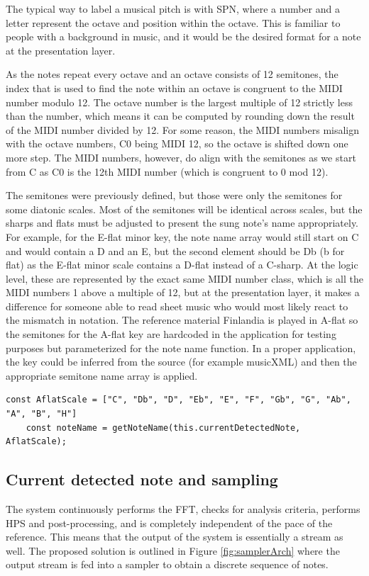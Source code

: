The typical way to label a musical pitch is with SPN, where a number and a letter represent the octave and position within the octave. This is familiar to people with a background in music, and it would be the desired format for a note at the presentation layer.

As the notes repeat every octave and an octave consists of 12 semitones, the index that is used to find the note within an octave is congruent to the MIDI number modulo 12. The octave number is the largest multiple of 12 strictly less than the number, which means it can be computed by rounding down the result of the MIDI number divided by 12. For some reason, the MIDI numbers misalign with the octave numbers, C0 being MIDI 12, so the octave is shifted down one more step. The MIDI numbers, however, do align with the semitones as we start from C as C0 is the 12th MIDI number (which is congruent to 0 mod 12).



The semitones were previously defined, but those were only the semitones for some diatonic scales. Most of the semitones will be identical across scales, but the sharps and flats must be adjusted to present the sung note's name appropriately. For example, for the E-flat minor key, the note name array would still start on C and would contain a D and an E, but the second element should be Db (b for flat) as the E-flat minor scale contains a D-flat instead of a C-sharp. At the logic level, these are represented by the exact same MIDI number class, which is all the MIDI numbers 1 above a multiple of 12, but at the presentation layer, it makes a difference for someone able to read sheet music who would most likely react to the mismatch in notation. The reference material Finlandia is played in A-flat so the semitones for the A-flat key are hardcoded in the application for testing purposes but parameterized for the note name function. In a proper application, the key could be inferred from the source (for example musicXML) and then the appropriate semitone name array is applied.

\begin{lstlisting}[style=javascript]
    const AflatScale = ["C", "Db", "D", "Eb", "E", "F", "Gb", "G", "Ab", "A", "B", "H"]
    const noteName = getNoteName(this.currentDetectedNote, AflatScale);
\end{lstlisting}

\subsection{Current detected note and sampling}
The system continuously performs the FFT, checks for analysis criteria, performs HPS and post-processing, and is completely independent of the pace of the reference. This means that the output of the system is essentially a stream as well. The proposed solution is outlined in Figure \ref{fig:samplerArch} where the output stream is fed into a sampler to obtain a discrete sequence of notes. 

